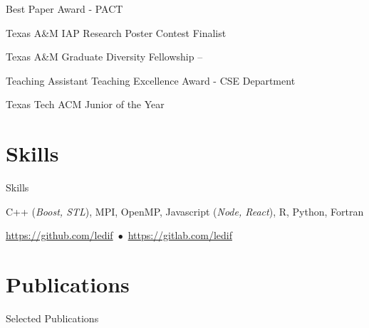 \documentclass[a4paper,10pt,oneside]{article}
\begin{document}
\begin{body}
Best Paper Award - PACT
\hfill
{}

Texas A\&M IAP Research Poster Contest Finalist
\hfill
{}

Texas A\&M Graduate Diversity Fellowship
\hfill
{}--

Teaching Assistant Teaching Excellence Award - CSE Department
\hfill
{}

%
%

Texas Tech ACM Junior of the Year
\hfill
{}

%



\section{Skills}
{Skills}

C++ (\emph{Boost, STL}), MPI, OpenMP, Javascript (\emph{Node, React}), R, Python, Fortran
\par
\EntryGap
\href{https://github.com/ledif}{https://github.com/ledif}
\,$\bullet$\,
\href{https://gitlab.com/ledif}{https://gitlab.com/ledif}




\section{Publications}
{Selected Publications}

%


\end{body}
\end{document}
